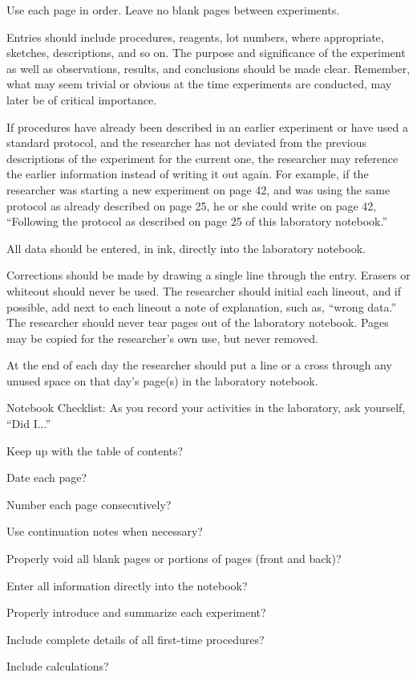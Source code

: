 \documentclass[12pt]{../SOP3_beta}
\begin{document}
\NP Use each page in order. Leave no blank pages between experiments.

\NP Entries should include procedures, reagents, lot numbers, where appropriate, sketches, descriptions, and so on. The purpose and significance of the experiment as well as observations, results, and conclusions should be made clear. Remember, what may seem trivial or obvious at the time experiments are conducted, may later be of critical importance.

\NP If procedures have already been described in an earlier experiment or have used a standard protocol, and the researcher has not deviated from the previous descriptions of the experiment for the current one, the researcher may reference the earlier information instead of writing it out again. For example, if the researcher was starting a new experiment on page 42, and was using the same protocol as already described on page 25, he or she could write on page 42, ``Following the protocol as described on page 25 of this laboratory notebook.''

\NP All data should be entered, in ink, directly into the laboratory notebook.

\NP Corrections should be made by drawing a single line through the entry. Erasers or whiteout should never be used. The researcher should initial each lineout, and if possible, add next to each lineout a note of explanation, such as, ``wrong data.'' The researcher should never tear pages out of the laboratory notebook. Pages may be copied for the researcher's own use, but never removed.

\NP At the end of each day the researcher should put a line or a cross through any unused space on that day's page(s) in the laboratory notebook.

\NP Notebook Checklist: As you record your activities in the laboratory, ask yourself, ``Did I...''

\begin{itemize*}
  \item Keep up with the table of contents?
  \item Date each page?
  \item Number each page consecutively?
  \item Use continuation notes when necessary?
  \item Properly void all blank pages or portions of pages (front and back)?
  \item Enter all information directly into the notebook?
  \item Properly introduce and summarize each experiment?
  \item Include complete details of all first-time procedures?
  \item Include calculations?
\end{itemize*}
\end{document}
